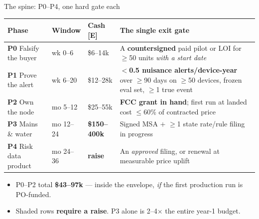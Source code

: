 \documentclass[aspectratio=169,t,10pt,xcolor={table,svgnames}]{beamer}
\newcommand{\hd}[1]{\textbf{\footnotesize #1}}
\begin{document}
\begin{frame}{The spine: P0--P4, one hard gate each}
  \scriptsize
  \begin{tabular}{@{}p{}p{}p{}p{}@{}}
    \toprule
    \hd{Phase} & \hd{Window} & \hd{Cash [E]} & \hd{The single exit gate} \\
    \midrule
    \textbf{P0} Falsify the buyer & wk 0--6  & \$6--14k  & A \textbf{countersigned} paid pilot or LOI for $\geq$50 units \emph{with a start date} \\
    \textbf{P1} Prove the alert   & wk 6--20 & \$12--28k & \textbf{$<$0.5 nuisance alerts/device-year} over $\geq$90 days on $\geq$50 devices, frozen eval set, $\geq$1 true event \\
    \textbf{P2} Own the node      & mo 5--12 & \$25--55k & \textbf{FCC grant in hand}; first run at landed cost $\leq$60\% of contracted price \\
    \rowcolor{fill1}
    \textbf{P3} Mains \& water    & mo 12--24& \textbf{\$150--400k} & Signed MSA $+$ $\geq$1 state rate/rule filing in progress \\
    \rowcolor{fill1}
    \textbf{P4} Risk data product & mo 24--36& \textbf{raise}       & An \emph{approved} filing, or renewal at measurable price uplift \\
    \bottomrule
  \end{tabular}
  \vspace{0.7em}
  \begin{itemize}\footnotesize
    \item P0--P2 total \textbf{\$43--97k} --- inside the envelope, \emph{if} the first production run
          is PO-funded.
    \item Shaded rows \textbf{require a raise}. P3 alone is 2--4$\times$ the entire year-1 budget.
  \end{itemize}
\end{frame}
\end{document}
